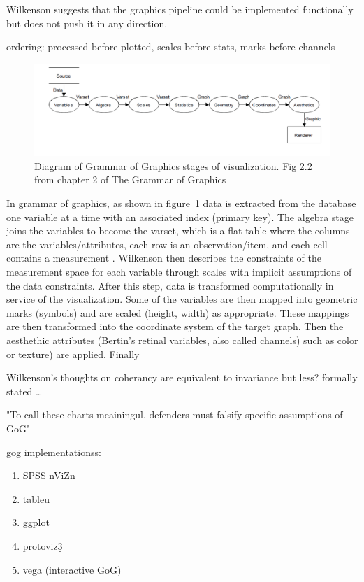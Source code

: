 \documentclass[letterpaper,onecolumn,titlepage]{Ythesis}
\begin{document}
Wilkenson suggests that the graphics pipeline could be implemented functionally but does not push it in any direction. 

ordering: processed before plotted, 
scales before stats, marks before channels
\begin{figure}
\includegraphics[]{figures/intro/gog_pathway.png}
\caption{Diagram of Grammar of Graphics stages of visualization. Fig 2.2 from chapter 2 of The Grammar of Graphics\cite{wilkinsonGrammarGraphics2005}}
\label{fig:gog_pathway}
\end{figure}
In grammar of graphics, as shown in figure~\ref{fig:gog_pathway} data is extracted from the database one variable at a time with an associated index (primary key). The algebra stage joins the variables to become the varset, which is a flat table where the columns are the variables/attributes, each row is an observation/item, and each cell contains a measurement \cite{munznerChDataAbstraction}. Wilkenson then describes the constraints of the measurement space for each variable through scales \cite{wilkinsonGrammarGraphics2005} with implicit assumptions of the data constraints. After this step, data is transformed computationally in service of the visualization. Some of the variables are then mapped into geometric marks (symbols) and are scaled (height, width) as appropriate. These mappings are then transformed into the coordinate system of the target graph. Then the aesthethic attributes (Bertin's retinal variables, also called channels) such as color or  texture) are applied. Finally

Wilkenson's thoughts on coherancy are equivalent to invariance but less? formally stated \dots

"To call these charts meainingul, defenders must falsify specific assumptions of GoG" \cite{wilkinsonMathematicalFoundationAnalytic2010}


gog implementationss:
\begin{enumerate}
    \item SPSS nViZn
    \item tableu
    \item ggplot
    \item protoviz\d3
    \item vega (interactive GoG)
\end{enumerate}


\printbibliography
\end{document}
